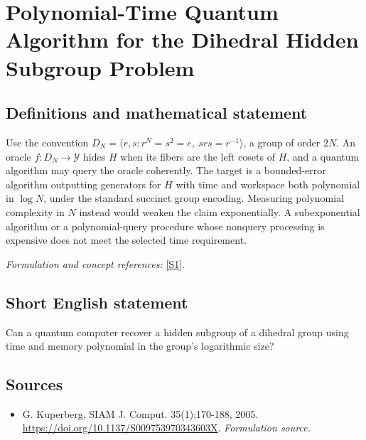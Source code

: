 \documentclass[11pt]{article}
\begin{document}
\section*{\texorpdfstring{Polynomial-Time Quantum Algorithm for the Dihedral Hidden Subgroup Problem}{Polynomial-Time Quantum Algorithm for the Dihedral Hidden Subgroup Problem}}\label{statement}
\subsection{Definitions and mathematical statement}
Use the convention
$D_N=\langle r,s:r^N=s^2=e,\ srs=r^{-1}\rangle$, a group of order $2N$. An oracle $f:D_N\to\mathcal Y$ hides $H$ when its fibers are the left cosets of $H$, and a quantum algorithm may query the oracle coherently. The target is a bounded-error algorithm outputting generators for $H$ with time and workspace both polynomial in $\log N$, under the standard succinct group encoding. Measuring polynomial complexity in $N$ instead would weaken the claim exponentially. A subexponential algorithm or a polynomial-query procedure whose nonquery processing is expensive does not meet the selected time requirement.
\par\smallskip\textit{Formulation and concept references:} \href{https://doi.org/10.1137/S009753970343603X}{[S1]}.

\subsection{Short English statement}
Can a quantum computer recover a hidden subgroup of a dihedral group using time and memory polynomial in the group's logarithmic size?
\subsection{Sources}
\begin{itemize}
\item[S1]G. Kuperberg, SIAM J. Comput. 35(1):170-188, 2005.
\url{https://doi.org/10.1137/S009753970343603X}.
\textit{Formulation source.}
\end{itemize}
\end{document}
